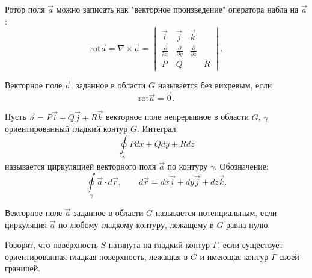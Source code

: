 \begin{remark}
    Ротор поля $ \vec{a} $ можно записать как "векторное произведение" оператора набла на $ \vec{a} $:
    \begin{equation} \nonumber
        \text{rot}\vec{a} = \nabla \times \vec{a} =
        \begin{vmatrix}
            \vec{i}                     & \vec{j}                     & \vec{k}                     \\
            \frac{\partial}{\partial x} & \frac{\partial}{\partial y} & \frac{\partial}{\partial z} \\ P & Q & & R
        \end{vmatrix}.
    \end{equation}
\end{remark}

\begin{definition}
    Векторное поле $ \vec{a} $, заданное в области $ G $ называется без вихревым, если
    \begin{equation} \nonumber
        \text{rot}\vec{a} = \vec{0}.
    \end{equation}
\end{definition}

\begin{definition}
    Пусть $ \vec{a} = P\vec{i} + Q\vec{j} + R\vec{k} $ векторное поле непрерывное в области $ G $, $ \gamma $
    ориентированный гладкий контур $ G $. Интеграл
    \begin{equation} \nonumber
        \oint\limits_{\gamma} Pdx + Qdy + Rdz
    \end{equation}
    называется циркуляцией векторного поля $ \vec{a} $ по контуру $ \gamma $. Обозначение:
    \begin{equation} \nonumber
        \oint\limits_{\gamma} \vec{a} \cdot d\vec{r}, \qquad d\vec{r} = dx\vec{i} + dy\vec{j} + dz\vec{k}.
    \end{equation}
\end{definition}

\begin{definition}
    Векторное поле $ \vec{a} $ заданное в области $ G $ называется потенциальным, если циркуляция $ \vec{a} $
    по любому гладкому контуру, лежащему в $ G $ равна нулю.
\end{definition}

\begin{definition}
    Говорят, что поверхность $ S $ натянута на гладкий контур $ \Gamma $, если существует ориентированная
    гладкая поверхность, лежащая в $ G $ и имеющая контур $ \Gamma $ своей границей.
\end{definition}

